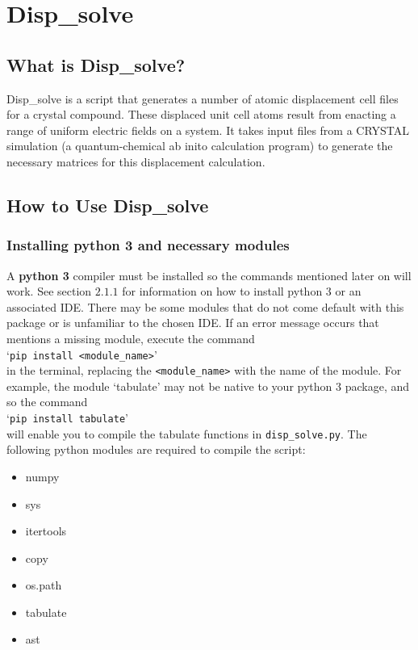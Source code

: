 \documentclass[10pt]{article}
\begin{document}
\section{Disp\_solve}
\subsection{What is Disp\_solve?}
Disp\_solve is a script that generates a number of atomic displacement cell files for a crystal compound. These displaced unit cell atoms result from enacting a range of uniform electric fields on a system. It takes input files from a CRYSTAL simulation (a quantum-chemical ab inito calculation program) to generate the necessary matrices for this displacement calculation. 

\subsection{How to Use Disp\_solve}
\subsubsection{Installing python 3 and necessary modules}
A \textbf{python 3} compiler must be installed so the commands mentioned later on will work. See section $2.1.1$ for information on how to install python 3 or an associated IDE. There may be some modules that do not come default with this package or is unfamiliar to the chosen IDE. If an error message occurs that mentions a missing module, execute the command 
\\
`\texttt{pip install <module\_name>}'
\\
 in the terminal, replacing the \texttt{<module\_name>} with the name of the module. For example, the module `tabulate' may not be native to your python 3 package, and so the command 
\\
 `\texttt{pip install tabulate}'
\\
 will enable you to compile the tabulate functions in \texttt{disp\_solve.py}. The following python modules are required to compile the script:
 
 \begin{itemize}
 	\item numpy
 	\item sys
 	\item itertools
 	\item copy
 	\item os.path
 	\item tabulate
 	\item ast
 \end{itemize}
\end{document}
